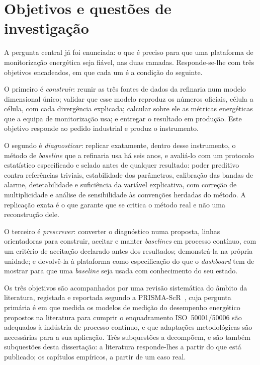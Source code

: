 \section{Objetivos e questões de investigação}
\label{sec:objetivos}

A pergunta central já foi enunciada: o que é preciso para que uma
plataforma de monitorização energética seja fiável, nas duas camadas.
Responde-se-lhe com três objetivos encadeados, em que cada um é a
condição do seguinte.

O primeiro é \emph{construir}: reunir as três fontes de dados da
refinaria num modelo dimensional único; validar que esse modelo
reproduz os números oficiais, célula a célula, com cada divergência
explicada; calcular sobre ele as métricas energéticas que a equipa de
monitorização usa; e entregar o resultado em produção. Este objetivo
responde ao pedido industrial e produz o instrumento.

O segundo é \emph{diagnosticar}: replicar exatamente, dentro desse
instrumento, o método de \emph{baseline} que a refinaria usa há seis
anos, e avaliá-lo com um protocolo estatístico especificado e selado
antes de qualquer resultado: poder preditivo contra referências
triviais, estabilidade dos parâmetros, calibração das bandas de alarme,
detetabilidade e suficiência da variável explicativa, com correção de
multiplicidade e análise de sensibilidade às convenções herdadas do
método. A replicação exata é o que garante que se critica o método real
e não uma reconstrução dele.

O terceiro é \emph{prescrever}: converter o diagnóstico numa proposta,
linhas orientadoras para construir, aceitar e manter \emph{baselines}
em processo contínuo, com um critério de aceitação declarado antes dos
resultados; demonstrá-la na própria unidade; e devolvê-la à plataforma
como especificação do que o \emph{dashboard} tem de mostrar para que uma
\emph{baseline} seja usada com conhecimento do seu estado.

Os três objetivos são acompanhados por uma revisão sistemática do
âmbito da literatura, registada e reportada segundo a
PRISMA-ScR~\cite{Tricco2018}, cuja pergunta primária é em que medida os
modelos de medição do desempenho energético propostos na literatura para
cumprir o enquadramento ISO~50001/50006 são adequados à indústria de
processo contínuo, e que adaptações metodológicas são necessárias para a
sua aplicação. Três subquestões a decompõem, e são também subquestões
desta dissertação: a literatura responde-lhes a partir do que está
publicado; os capítulos empíricos, a partir de um caso real.

